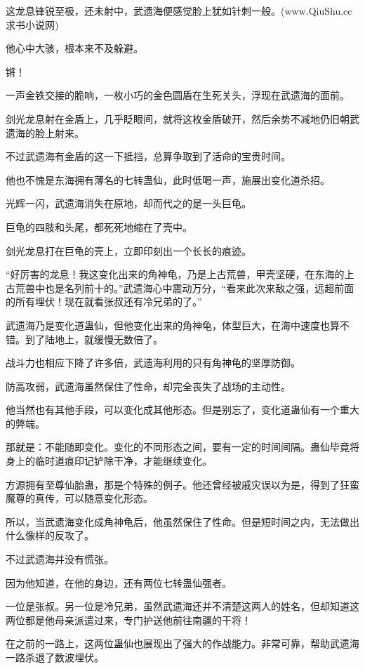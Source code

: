 
\begin{this_body}

这龙息锋锐至极，还未射中，武遗海便感觉脸上犹如针刺一般。(www.QiuShu.cc 求书小说网)

他心中大骇，根本来不及躲避。

锵！

一声金铁交接的脆响，一枚小巧的金色圆盾在生死关头，浮现在武遗海的面前。

剑光龙息射在金盾上，几乎眨眼间，就将这枚金盾破开，然后余势不减地仍旧朝武遗海的脸上射来。

不过武遗海有金盾的这一下抵挡，总算争取到了活命的宝贵时间。

他也不愧是东海拥有薄名的七转蛊仙，此时低喝一声，施展出变化道杀招。

光辉一闪，武遗海消失在原地，却而代之的是一头巨龟。

巨龟的四肢和头尾，都死死地缩在了壳中。

剑光龙息打在巨龟的壳上，立即印刻出一个长长的痕迹。

“好厉害的龙息！我这变化出来的角神龟，乃是上古荒兽，甲壳坚硬，在东海的上古荒兽中也是名列前十的。”武遗海心中震动万分，“看来此次来敌之强，远超前面的所有埋伏！现在就看张叔还有冷兄弟的了。”

武遗海乃是变化道蛊仙，但他变化出来的角神龟，体型巨大，在海中速度也算不错。到了陆地上，就缓慢无数倍了。

战斗力也相应下降了许多倍，武遗海利用的只有角神龟的坚厚防御。

防高攻弱，武遗海虽然保住了性命，却完全丧失了战场的主动性。

他当然也有其他手段，可以变化成其他形态。但是别忘了，变化道蛊仙有一个重大的弊端。

那就是：不能随即变化。变化的不同形态之间，要有一定的时间间隔。蛊仙毕竟将身上的临时道痕印记铲除干净，才能继续变化。

方源拥有至尊仙胎蛊，那是个特殊的例子。他还曾经被戚灾误以为是，得到了狂蛮魔尊的真传，可以随意变化形态。

所以，当武遗海变化成角神龟后，他虽然保住了性命。但是短时间之内，无法做出什么像样的反攻了。

不过武遗海并没有慌张。

因为他知道，在他的身边，还有两位七转蛊仙强者。

一位是张叔。另一位是冷兄弟，虽然武遗海还并不清楚这两人的姓名，但却知道这两位都是他母亲派遣过来，专门护送他前往南疆的干将！

在之前的一路上，这两位蛊仙也展现出了强大的作战能力。非常可靠，帮助武遗海一路杀退了数波埋伏。


\end{this_body}
